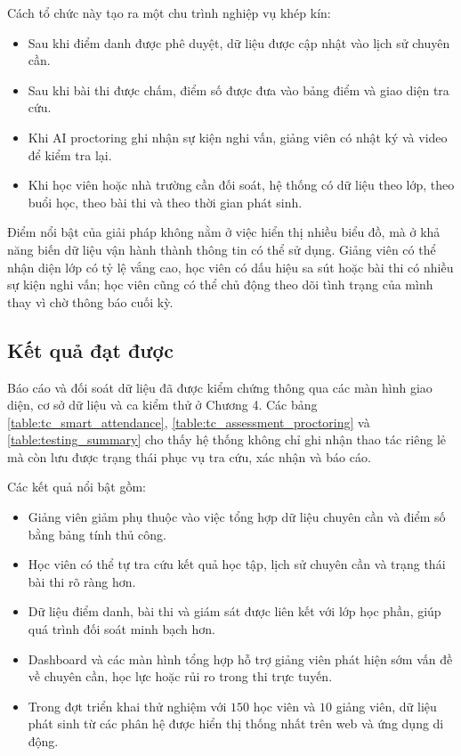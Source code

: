 \documentclass[../DoAn.tex]{subfiles}
\begin{document}
Cách tổ chức này tạo ra một chu trình nghiệp vụ khép kín:
\begin{itemize}
    \item Sau khi điểm danh được phê duyệt, dữ liệu được cập nhật vào lịch sử chuyên cần.
    \item Sau khi bài thi được chấm, điểm số được đưa vào bảng điểm và giao diện tra cứu.
    \item Khi AI proctoring ghi nhận sự kiện nghi vấn, giảng viên có nhật ký và video để kiểm tra lại.
    \item Khi học viên hoặc nhà trường cần đối soát, hệ thống có dữ liệu theo lớp, theo buổi học, theo bài thi và theo thời gian phát sinh.
\end{itemize}

Điểm nổi bật của giải pháp không nằm ở việc hiển thị nhiều biểu đồ, mà ở khả năng biến dữ liệu vận hành thành thông tin có thể sử dụng. Giảng viên có thể nhận diện lớp có tỷ lệ vắng cao, học viên có dấu hiệu sa sút hoặc bài thi có nhiều sự kiện nghi vấn; học viên cũng có thể chủ động theo dõi tình trạng của mình thay vì chờ thông báo cuối kỳ.

\subsection{Kết quả đạt được}
Báo cáo và đối soát dữ liệu đã được kiểm chứng thông qua các màn hình giao diện, cơ sở dữ liệu và ca kiểm thử ở Chương 4. Các bảng \ref{table:tc_smart_attendance}, \ref{table:tc_assessment_proctoring} và \ref{table:testing_summary} cho thấy hệ thống không chỉ ghi nhận thao tác riêng lẻ mà còn lưu được trạng thái phục vụ tra cứu, xác nhận và báo cáo.

Các kết quả nổi bật gồm:
\begin{itemize}
    \item Giảng viên giảm phụ thuộc vào việc tổng hợp dữ liệu chuyên cần và điểm số bằng bảng tính thủ công.
    \item Học viên có thể tự tra cứu kết quả học tập, lịch sử chuyên cần và trạng thái bài thi rõ ràng hơn.
    \item Dữ liệu điểm danh, bài thi và giám sát được liên kết với lớp học phần, giúp quá trình đối soát minh bạch hơn.
    \item Dashboard và các màn hình tổng hợp hỗ trợ giảng viên phát hiện sớm vấn đề về chuyên cần, học lực hoặc rủi ro trong thi trực tuyến.
    \item Trong đợt triển khai thử nghiệm với $150$ học viên và $10$ giảng viên, dữ liệu phát sinh từ các phân hệ được hiển thị thống nhất trên web và ứng dụng di động.
\end{itemize}
\end{document}
